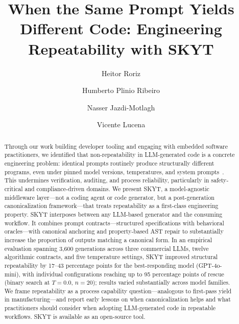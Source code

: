 \documentclass[sigconf]{acmart}
\begin{document}
\title[Engineering Repeatability with SKYT]{When the Same Prompt Yields Different Code: Engineering Repeatability with SKYT}

\author{Heitor Roriz}

\author{Humberto Plinio Ribeiro}

\author{Nasser Jazdi-Motlagh}

\author{Vicente Lucena}

\renewcommand{\shortauthors}{Roriz et al.}
\renewcommand{\shorttitle}{Engineering Repeatability with SKYT}

\begin{abstract}
Through our work building developer tooling and engaging with embedded software practitioners, we identified that non-repeatability in LLM-generated code is a concrete engineering problem: identical prompts routinely produce structurally different programs, even under pinned model versions, temperatures, and system prompts~\cite{ouyang2023llm}. This undermines verification, auditing, and process reliability, particularly in safety-critical and compliance-driven domains. We present SKYT, a model-agnostic middleware layer---not a coding agent or code generator, but a post-generation canonicalization framework---that treats repeatability as a first-class engineering property. SKYT interposes between any LLM-based generator and the consuming workflow. It combines prompt contracts---structured specifications with behavioral oracles---with canonical anchoring and property-based AST repair to substantially increase the proportion of outputs matching a canonical form. In an empirical evaluation spanning 3{,}600 generations across three commercial LLMs, twelve algorithmic contracts, and five temperature settings, SKYT improved structural repeatability by 17--43 percentage points for the best-responding model (GPT-4o-mini), with individual configurations reaching up to 95 percentage points of rescue (binary search at $T{=}0.0$, $n{=}20$); results varied substantially across model families. We frame repeatability as a process capability question---analogous to first-pass yield in manufacturing---and report early lessons on when canonicalization helps and what practitioners should consider when adopting LLM-generated code in repeatable workflows. SKYT is available as an open-source tool.
\end{abstract}
\end{document}
